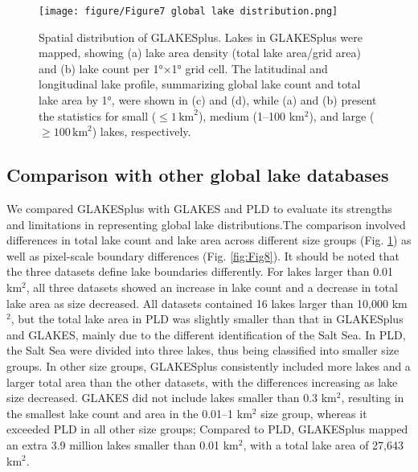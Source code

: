 \documentclass[preprint,12pt,authoryear]{elsarticle}
\begin{document}
\begin{figure}[h]
    \centering
    \texttt{[image: figure/Figure7 global lake distribution.png]}
    \caption{Spatial distribution of GLAKESplus. Lakes in GLAKESplus were mapped, showing (a) lake area density (total lake area/grid area) and (b) lake count per 1°×1° grid cell. The latitudinal and longitudinal lake profile, summarizing global lake count and total lake area by 1°, were shown in (c) and (d), while (a) and (b) present the statistics for small ($\le 1 \,\text{km}^2$), medium (1–100 km$^2$), and large ($\ge 100 \,\text{km}^2$) lakes, respectively.}
    \label{fig:Fig7}
\end{figure}

\subsection{Comparison with other global lake databases}
\label{subsec33}

We compared GLAKESplus with GLAKES and PLD to evaluate its strengths and limitations in representing global lake distributions.The comparison involved differences in total lake count and lake area across different size groups (Fig. \ref{fig:Fig7}) as well as pixel-scale boundary differences (Fig. \ref{fig:Fig8}). It should be noted that the three datasets define lake boundaries differently. For lakes larger than 0.01 km$^2$, all three datasets showed an increase in lake count and a decrease in total lake area as size decreased. All datasets contained 16 lakes larger than 10,000 km$^2$, but the total lake area in PLD was slightly smaller than that in GLAKESplus and GLAKES, mainly due to the different identification of the Salt Sea. In PLD, the Salt Sea were divided into three lakes, thus being classified into smaller size groups. In other size groups, GLAKESplus consistently included more lakes and a larger total area than the other datasets, with the differences increasing as lake size decreased. GLAKES did not include lakes smaller than 0.3 km$^2$, resulting in the smallest lake count and area in the 0.01–1 km$^2$ size group, whereas it exceeded PLD in all other size groups; Compared to PLD, GLAKESplus mapped an extra 3.9 million lakes smaller than 0.01 km$^2$, with a total lake area of 27,643 km$^2$. 
\end{document}
